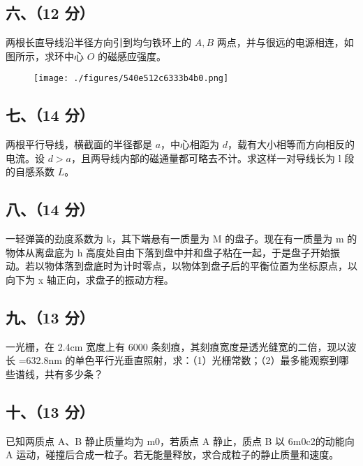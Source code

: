 \subsection{六、（12 分）}
两根长直导线沿半径方向引到均匀铁环上的 $A,B$ 两点，并与很远的电源相连，如图所示，求环中心 $O$ 的磁感应强度。
\begin{figure}[ht]
\centering
\texttt{[image: ./figures/540e512c6333b4b0.png]}
\caption{} \label{fig_NJUD3_6}
\end{figure}
\subsection{七、（14 分）}
两根平行导线，横截面的半径都是 $a$，中心相距为 $d$，载有大小相等而方向相反的电流。设 $d>a$，且两导线内部的磁通量都可略去不计。求这样一对导线长为 l 段的自感系数 $L$。
\subsection{八、（14 分）}
一轻弹簧的劲度系数为 k，其下端悬有一质量为 M 的盘子。现在有一质量为 m 的物体从离盘底为 h 高度处自由下落到盘中并和盘子粘在一起，于是盘子开始振动。若以物体落到盘底时为计时零点，以物体到盘子后的平衡位置为坐标原点，以向下为 x 轴正向，求盘子的振动方程。
\subsection{九、（13 分）}
一光栅，在 2.4cm 宽度上有 6000 条刻痕，其刻痕宽度是透光缝宽的二倍，现以波长 =632.8nm 的单色平行光垂直照射，求：（1）光栅常数；（2）最多能观察到哪些谱线，共有多少条？
\subsection{十、（13 分）}
已知两质点 A、B 静止质量均为 m0，若质点 A 静止，质点 B 以 6m0c2的动能向 A 运动，碰撞后合成一粒子。若无能量释放，求合成粒子的静止质量和速度。